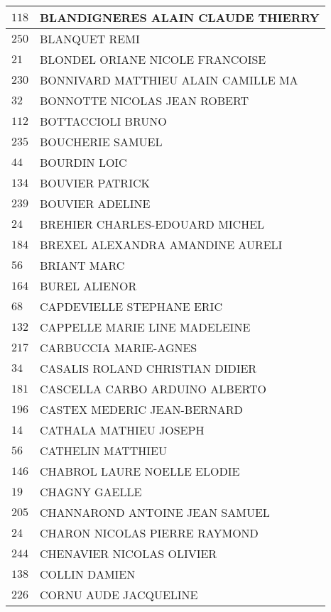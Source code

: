 \begin{xltabular}{\linewidth}{|l|X|}
    \hline
    $118$ & BLANDIGNERES ALAIN CLAUDE THIERRY \\
    \hline
    $250$ & BLANQUET REMI \\
    \hline
    $21$ & BLONDEL ORIANE NICOLE FRANCOISE \\
    \hline
    $230$ & BONNIVARD MATTHIEU ALAIN CAMILLE MA \\
    \hline
    $32$ & BONNOTTE NICOLAS JEAN ROBERT \\
    \hline
    $112$ & BOTTACCIOLI BRUNO \\
    \hline
    $235$ & BOUCHERIE SAMUEL \\
    \hline
    $44$ & BOURDIN LOIC \\
    \hline
    $134$ & BOUVIER PATRICK \\
    \hline
    $239$ & BOUVIER ADELINE \\
    \hline
    $24$ & BREHIER CHARLES-EDOUARD MICHEL \\
    \hline
    $184$ & BREXEL ALEXANDRA AMANDINE AURELI \\
    \hline
    $56$ & BRIANT MARC \\
    \hline
    $164$ & BUREL ALIENOR \\
    \hline
    $68$ & CAPDEVIELLE STEPHANE ERIC \\
    \hline
    $132$ & CAPPELLE MARIE LINE MADELEINE \\
    \hline
    $217$ & CARBUCCIA MARIE-AGNES \\
    \hline
    $34$ & CASALIS ROLAND CHRISTIAN DIDIER \\
    \hline
    $181$ & CASCELLA CARBO ARDUINO ALBERTO \\
    \hline
    $196$ & CASTEX MEDERIC JEAN-BERNARD \\
    \hline
    $14$ & CATHALA MATHIEU JOSEPH \\
    \hline
    $56$ & CATHELIN MATTHIEU \\
    \hline
    $146$ & CHABROL LAURE NOELLE ELODIE \\
    \hline
    $19$ & CHAGNY GAELLE \\
    \hline
    $205$ & CHANNAROND ANTOINE JEAN SAMUEL \\
    \hline
    $24$ & CHARON NICOLAS PIERRE RAYMOND \\
    \hline
    $244$ & CHENAVIER NICOLAS OLIVIER \\
    \hline
    $138$ & COLLIN DAMIEN \\
    \hline
    $226$ & CORNU AUDE JACQUELINE \\
    \hline

\end{xltabular}
